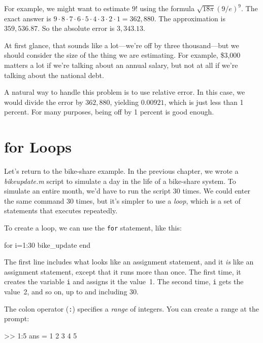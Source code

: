 For example, we might want to estimate $9!$ using the formula
$\sqrt {18 \pi} ( 9 / e)^9$.  The exact answer is $9 \cdot 8 \cdot 7 \cdot 6
\cdot 5 \cdot 4 \cdot 3 \cdot 2 \cdot 1 = 362,880$.  The approximation
is $359,536.87$.  So the absolute error is $3,343.13$.

At first glance, that sounds like a lot---we're off by three
thousand---but we should consider the size of the
thing we are estimating.  For example, \$3,000 matters a lot
if we're talking about an annual salary, but not at all if we're talking about the national debt.

A natural way to handle this problem is to use relative
error.
In this case, we would divide the error
by $362,880$, yielding $0.00921$, which is just less than 1 percent.
For many purposes, being off by 1 percent is good enough.


\section{for Loops}


Let's return to the bike-share example.
In the previous chapter, we wrote a \emph{bike\textunderscore update.m} script to simulate a
day in the life of a bike-share system. To simulate an entire
month, we'd have to run the script 30 times. We could enter the same command 30 times, but it's simpler to use a \emph{loop}, which is a set of statements that executes repeatedly.

To create a loop, we can use the \lstinline{for} statement, like this:

\begin{code}
for i=1:30
    bike_update
end
\end{code}

The first line includes what looks like an assignment statement, and it \emph{is}
like an assignment statement, except that it runs more than once.  The
first time, it creates the variable \lstinline{i} and assigns it the
value~1.  The second time, \lstinline{i} gets the value~2, and so on, up to
and including 30.


The colon operator (\lstinline{:}) specifies a \emph{range} of integers.
You can create a range at the prompt:

\begin{code}
>> 1:5
ans =  1     2     3     4     5
\end{code}

